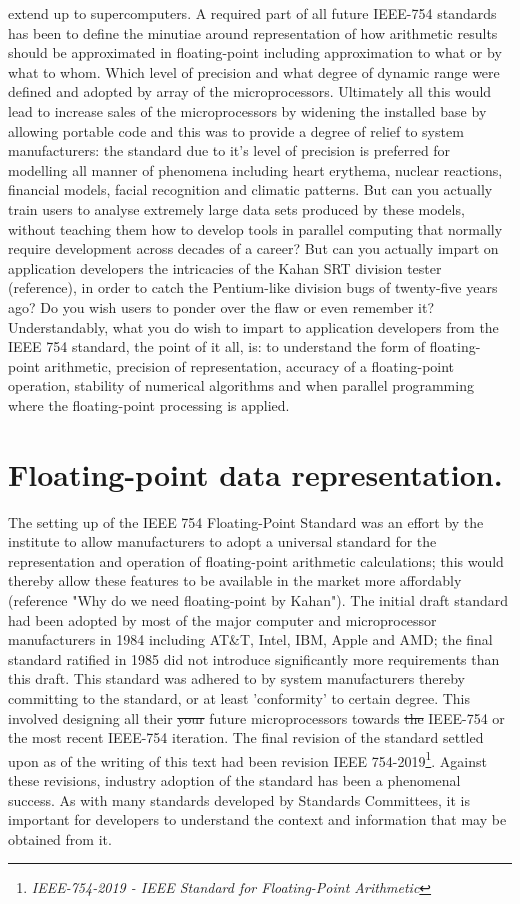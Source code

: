 \documentclass[7pt]{article}
\begin{document}
extend up to supercomputers. A required part of all future IEEE-754 standards has been to define the minutiae around representation of how arithmetic results should be approximated in floating-point including approximation to what or by what to whom. Which level of precision and what degree of dynamic range were defined and adopted by array of the microprocessors. Ultimately all this would lead to increase sales of the microprocessors by widening the installed base by allowing portable code and this was to provide a degree of relief to system manufacturers: the standard due to it's level of precision is preferred for modelling all manner of phenomena including heart erythema, nuclear reactions, financial models, facial recognition and climatic patterns. But can you actually train users to analyse  extremely large data sets produced by these models, without teaching them how to develop tools in parallel computing that normally require development across decades of a career? But can you actually impart on application developers the intricacies of the Kahan SRT division tester (reference), in order to catch the Pentium-like division bugs of twenty-five years ago? Do you wish users to ponder over the flaw or even remember it? Understandably, what you do wish to impart to application developers from the IEEE 754 standard, the point of it all, is: to understand the form of floating-point arithmetic, precision of representation, accuracy of a floating-point operation, stability of numerical algorithms and when parallel programming where the floating-point processing is applied. 

\section*{Floating-point data representation.}  

The setting up of the IEEE 754 Floating-Point Standard was an effort by the institute to allow  manufacturers to adopt a universal standard for the representation and operation of floating-point arithmetic calculations; this would thereby allow these features to be available in the market more affordably (reference "Why do we need floating-point by Kahan"). The initial  draft standard had been adopted by most of the major computer and microprocessor manufacturers in 1984  including AT\&T, Intel, IBM, Apple and AMD; the final standard ratified in 1985 did not introduce significantly more requirements than this draft. This standard was adhered to by system manufacturers thereby committing to the standard, or at least 'conformity' to certain degree. This involved designing all their \st{your} future microprocessors towards \st{the} IEEE-754 or the most recent IEEE-754 iteration. The final revision of the standard settled upon as of the writing of this text had been revision IEEE 754-2019\footnote{\textit{IEEE-754-2019 - IEEE Standard for Floating-Point Arithmetic}}. Against these revisions, industry adoption of the standard has been a phenomenal success. As with many standards developed by Standards Committees, it is important for developers to understand the context and information that may be obtained from it.
\end{document}
